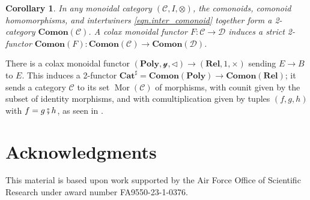 \documentclass[11pt, one side, article]{memoir}
\theoremstyle{definition}
\theoremstyle{plain}
\newtheorem{corollary}[definitionx]{Corollary}
\newenvironment{example}
  {\pushQED{\qed}\renewcommand{\qedsymbol}{$\lozenge$}\examplex}
  {\popQED\endexamplex}
\DeclareMathOperator{\Mor}{Mor}
\newcommand{\cat}[1]{\mathcal{#1}}%
\newcommand{\Cat}[1]{\mathbf{#1}}%
\newcommand{\then}{\mathbin{\fatsemi}}
\newcommand{\catsharp}{\Cat{Cat}^{\sharp}}
\newcommand{\yon}{\mathcal{y}}
\newcommand{\poly}{\Cat{Poly}}
\newcommand{\0}{\textsf{0}}
\newcommand{\1}{\tn{\textsf{1}}}
\newcommand{\tri}{\mathbin{\triangleleft}}
\begin{document}
\begin{corollary}\label{cor.main}
In any monoidal category $(\cat{C},I,\otimes)$, the comonoids, comonoid homomorphisms, and intertwiners \eqref{eqn.inter_comonoid} together form a 2-category $\Cat{Comon}(\cat{C})$. A colax monoidal functor $F\colon\cat{C}\to\cat{D}$ induces a strict 2-functor $\Cat{Comon}(F)\colon\Cat{Comon}(\cat{C})\to\Cat{Comon}(\cat{D})$.
\end{corollary}

\begin{example}
There is a colax monoidal functor $(\poly,\yon,\tri)\to(\Cat{Rel},1,\times)$ sending $E\to B$ to $E$. This induces a 2-functor $\catsharp=\Cat{Comon}(\poly)\to\Cat{Comon}(\Cat{Rel})$; it sends a category $\cat{C}$ to its set $\Mor(\cat{C})$ of morphisms, with counit given by the subset of identity morphisms, and with comultiplication given by tuples $(f,g,h)$ with $f=g\then h$, as seen in \cite{pare2013comonoids}.
\end{example}


\section*{Acknowledgments}
This material is based upon work supported by the Air Force Office of Scientific Research under award number FA9550-23-1-0376.

\printbibliography 
\end{document}
